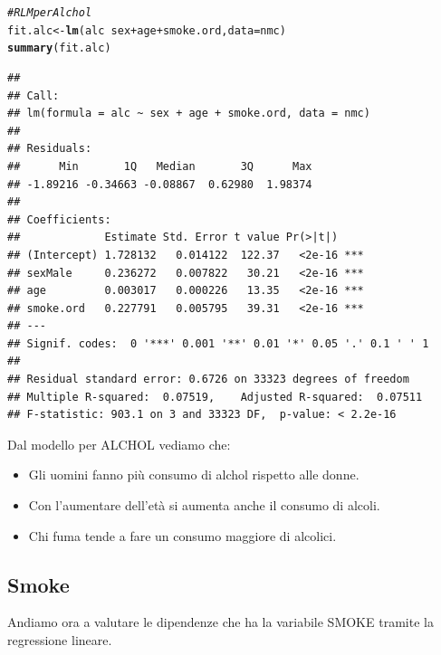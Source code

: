 \documentclass{article}\usepackage[]{graphicx}\usepackage[]{xcolor}
\makeatletter
\newcommand{\hlcom}[1]{\textcolor[rgb]{0.678,0.584,0.686}{\textit{#1}}}%
\newcommand{\hlopt}[1]{\textcolor[rgb]{0,0,0}{#1}}%
\newcommand{\hlstd}[1]{\textcolor[rgb]{0.345,0.345,0.345}{#1}}%
\newcommand{\hlkwb}[1]{\textcolor[rgb]{0.69,0.353,0.396}{#1}}%
\newcommand{\hlkwc}[1]{\textcolor[rgb]{0.333,0.667,0.333}{#1}}%
\newcommand{\hlkwd}[1]{\textcolor[rgb]{0.737,0.353,0.396}{\textbf{#1}}}%
\newenvironment{kframe}{%
 \def\at@end@of@kframe{}%
 \ifinner\ifhmode%
  \def\at@end@of@kframe{\end{minipage}}%
  \begin{minipage}{\columnwidth}%
 \fi\fi%
 \def\FrameCommand##1{\hskip\@totalleftmargin \hskip-\fboxsep
 \colorbox{shadecolor}{##1}\hskip-\fboxsep
     \hskip-\linewidth \hskip-\@totalleftmargin \hskip\columnwidth}%
 \MakeFramed {\advance\hsize-\width
   \@totalleftmargin\z@ \linewidth\hsize
   \@setminipage}}%
 {\par\unskip\endMakeFramed%
 \at@end@of@kframe}
\newenvironment{knitrout}{}{} %
\makeatother
\begin{document}
\begin{knitrout}
\color{fgcolor}\begin{kframe}
\begin{alltt}
\hlcom{#RLM per Alchol}
\hlstd{fit.alc} \hlkwb{<-} \hlkwd{lm}\hlstd{(alc}\hlopt{~}\hlstd{sex}\hlopt{+}\hlstd{age}\hlopt{+}\hlstd{smoke.ord,} \hlkwc{data}\hlstd{=nmc)}
\hlkwd{summary}\hlstd{(fit.alc)}
\end{alltt}
\begin{verbatim}
## 
## Call:
## lm(formula = alc ~ sex + age + smoke.ord, data = nmc)
## 
## Residuals:
##      Min       1Q   Median       3Q      Max 
## -1.89216 -0.34663 -0.08867  0.62980  1.98374 
## 
## Coefficients:
##             Estimate Std. Error t value Pr(>|t|)    
## (Intercept) 1.728132   0.014122  122.37   <2e-16 ***
## sexMale     0.236272   0.007822   30.21   <2e-16 ***
## age         0.003017   0.000226   13.35   <2e-16 ***
## smoke.ord   0.227791   0.005795   39.31   <2e-16 ***
## ---
## Signif. codes:  0 '***' 0.001 '**' 0.01 '*' 0.05 '.' 0.1 ' ' 1
## 
## Residual standard error: 0.6726 on 33323 degrees of freedom
## Multiple R-squared:  0.07519,	Adjusted R-squared:  0.07511 
## F-statistic: 903.1 on 3 and 33323 DF,  p-value: < 2.2e-16
\end{verbatim}
\end{kframe}
\end{knitrout}
    
    Dal modello per ALCHOL vediamo che:
    \begin{itemize}
      \item Gli uomini fanno più consumo di alchol rispetto alle donne.
      \item Con l'aumentare dell'età si aumenta anche il consumo di alcoli.
      \item Chi fuma tende a fare un consumo maggiore di alcolici.
    \end{itemize}
    
  \subsection{Smoke}
    Andiamo ora a valutare le dipendenze che ha la variabile SMOKE tramite
    la regressione lineare.
    
\end{document}
